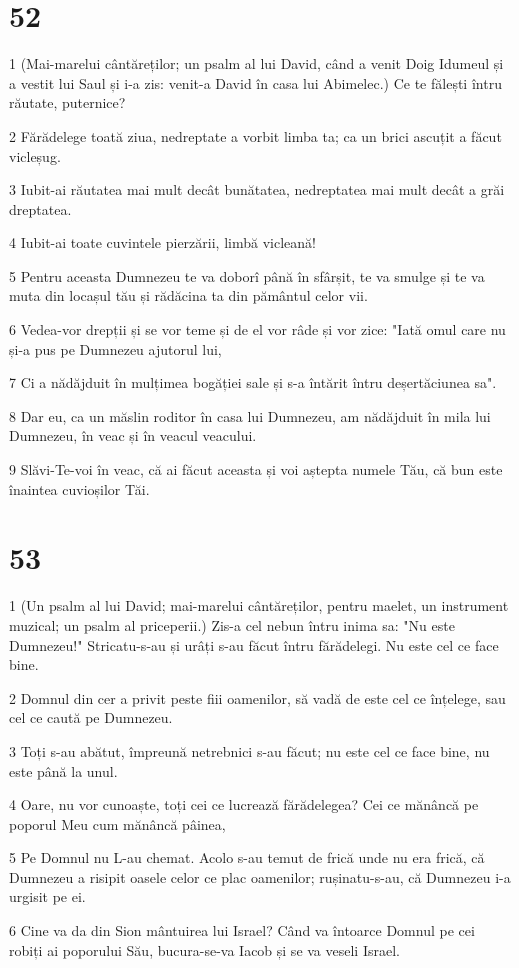 \chapter{52}

\par 1 (Mai-marelui cântăreților; un psalm al lui David, când a venit Doig Idumeul și a vestit lui Saul și i-a zis: venit-a David în casa lui Abimelec.) Ce te fălești întru răutate, puternice?
\par 2 Fărădelege toată ziua, nedreptate a vorbit limba ta; ca un brici ascuțit a făcut vicleșug.
\par 3 Iubit-ai răutatea mai mult decât bunătatea, nedreptatea mai mult decât a grăi dreptatea.
\par 4 Iubit-ai toate cuvintele pierzării, limbă vicleană!
\par 5 Pentru aceasta Dumnezeu te va doborî până în sfârșit, te va smulge și te va muta din locașul tău și rădăcina ta din pământul celor vii.
\par 6 Vedea-vor drepții și se vor teme și de el vor râde și vor zice: "Iată omul care nu și-a pus pe Dumnezeu ajutorul lui,
\par 7 Ci a nădăjduit în mulțimea bogăției sale și s-a întărit întru deșertăciunea sa".
\par 8 Dar eu, ca un măslin roditor în casa lui Dumnezeu, am nădăjduit în mila lui Dumnezeu, în veac și în veacul veacului.
\par 9 Slăvi-Te-voi în veac, că ai făcut aceasta și voi aștepta numele Tău, că bun este înaintea cuvioșilor Tăi.

\chapter{53}

\par 1 (Un psalm al lui David; mai-marelui cântăreților, pentru maelet, un instrument muzical; un psalm al priceperii.) Zis-a cel nebun întru inima sa: "Nu este Dumnezeu!" Stricatu-s-au și urâți s-au făcut întru fărădelegi. Nu este cel ce face bine.
\par 2 Domnul din cer a privit peste fiii oamenilor, să vadă de este cel ce înțelege, sau cel ce caută pe Dumnezeu.
\par 3 Toți s-au abătut, împreună netrebnici s-au făcut; nu este cel ce face bine, nu este până la unul.
\par 4 Oare, nu vor cunoaște, toți cei ce lucrează fărădelegea? Cei ce mănâncă pe poporul Meu cum mănâncă pâinea,
\par 5 Pe Domnul nu L-au chemat. Acolo s-au temut de frică unde nu era frică, că Dumnezeu a risipit oasele celor ce plac oamenilor; rușinatu-s-au, că Dumnezeu i-a urgisit pe ei.
\par 6 Cine va da din Sion mântuirea lui Israel? Când va întoarce Domnul pe cei robiți ai poporului Său, bucura-se-va Iacob și se va veseli Israel.

